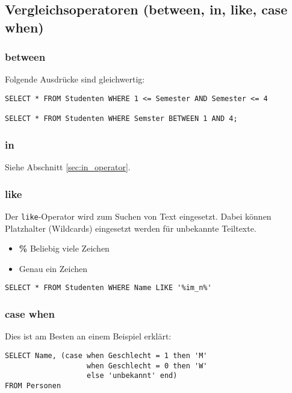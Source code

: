 \subsection{Vergleichsoperatoren (between, in, like, case when)}

\subsubsection{between}
Folgende Ausdrücke sind gleichwertig:

\begin{lstlisting}[caption={Beispiel between}]
SELECT * FROM Studenten WHERE 1 <= Semester AND Semester <= 4
        
SELECT * FROM Studenten WHERE Semster BETWEEN 1 AND 4;
\end{lstlisting}

\subsubsection{in}
Siehe Abschnitt \ref{sec:in_operator}.

\subsubsection{like}
Der \texttt{like}-Operator wird zum Suchen von Text eingesetzt. Dabei können Platzhalter (Wildcards) eingesetzt werden für unbekannte Teiltexte.

\begin{itemize}
  \item \textbf{\%} Beliebig viele Zeichen
  \item \textbf{\underline {{ }{ }}} Genau ein Zeichen
\end{itemize}

\begin{lstlisting}[caption={Beispiel für like Operator}]
SELECT * FROM Studenten WHERE Name LIKE '%im_n%'
\end{lstlisting}

\subsubsection{case when}
Dies ist am Besten an einem Beispiel erklärt:

\begin{lstlisting}[caption={Beispiel für case when}]
SELECT Name, (case when Geschlecht = 1 then 'M'
                   when Geschlecht = 0 then 'W'
                   else 'unbekannt' end)
FROM Personen
\end{lstlisting}

